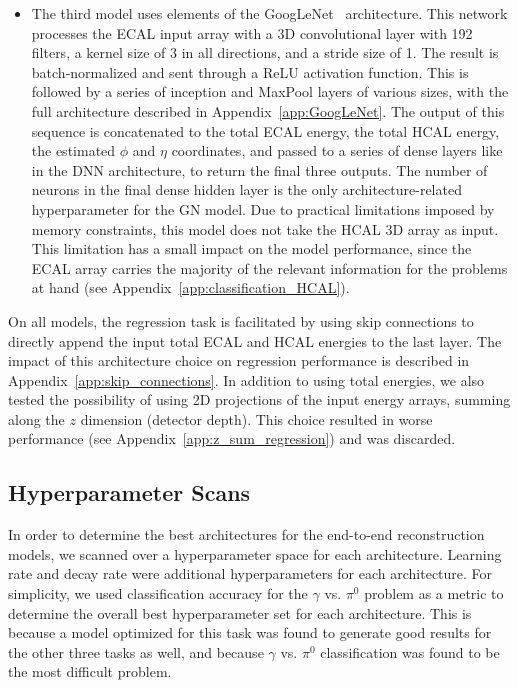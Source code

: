 \begin{itemize}
    \item The third model uses elements of the GoogLeNet~\cite{GoogLeNet} architecture. This network processes the ECAL input array with a 3D convolutional layer with 192 filters, a kernel size of 3 in all directions, and a stride size of 1. The result is batch-normalized and sent through a ReLU activation function. This is followed by a series of inception and MaxPool layers of various sizes, with the full architecture described in Appendix~\ref{app:GoogLeNet}. The output of this sequence is concatenated to the total ECAL energy, the total HCAL energy, the estimated $\phi$ and $\eta$ coordinates, and passed to a series of dense layers like in the DNN architecture, to return the final three outputs. The number of neurons in the final dense hidden layer is the only architecture-related hyperparameter for the GN model. Due to practical limitations imposed by memory constraints, this model does not take the HCAL 3D array as input. This limitation has a small impact on the model performance, since the ECAL array carries the majority of the relevant information for the problems at hand (see Appendix~\ref{app:classification_HCAL}).
\end{itemize}

On all models, the regression task is facilitated by using skip connections to directly append the input total ECAL and HCAL energies to the last layer. The impact of this architecture choice on regression performance is described in Appendix~\ref{app:skip_connections}. In addition to using total energies, we also tested the possibility of using 2D projections of the input energy arrays, summing along the $z$ dimension (detector depth). This choice resulted in worse performance (see Appendix~\ref{app:z_sum_regression}) and was discarded.

\subsection{Hyperparameter Scans}
\label{sec:hpscan}

In order to determine the best architectures for the end-to-end reconstruction models, we scanned over a hyperparameter space for each architecture. Learning rate and decay rate were additional hyperparameters for each architecture. For simplicity, we used classification accuracy for the $\gamma$ vs. $\pi^0$ problem as a metric to determine the overall best hyperparameter set for each architecture. This is because a model optimized for this task was found to generate good results for the other three tasks as well, and because $\gamma$ vs. $\pi^0$ classification was found to be the most difficult problem.

